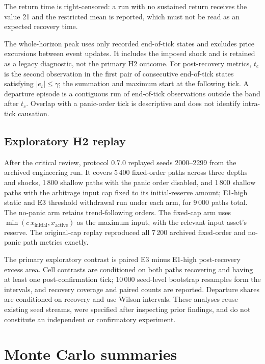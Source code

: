 The return time is right-censored: a run with no sustained return receives the value 21 and the restricted mean is reported, which must not be read as an expected recovery time.

The whole-horizon peak uses only recorded end-of-tick states and excludes price excursions between event updates. It includes the imposed shock and is retained as a legacy diagnostic, not the primary H2 outcome. For post-recovery metrics, $t_c$ is the second observation in the first pair of consecutive end-of-tick states satisfying $|e_t|\le\gamma$; the summation and maximum start at the following tick. A departure episode is a contiguous run of end-of-tick observations outside the band after $t_c$. Overlap with a panic-order tick is descriptive and does not identify intra-tick causation.

\subsection{Exploratory H2 replay}
\label{sec:h2-replay-method}

After the critical review, protocol 0.7.0 replayed seeds 2000--2299 from the archived engineering run. It covers 5\,400 fixed-order paths across three depths and shocks, 1\,800 shallow paths with the panic order disabled, and 1\,800 shallow paths with the arbitrage input cap fixed to its initial-reserve amount; E1-high static and E3 threshold withdrawal run under each arm, for 9\,000 paths total. The no-panic arm retains trend-following orders. The fixed-cap arm uses $\min(c\,x_{\mathrm{initial}},x_{\mathrm{active}})$ as the maximum input, with the relevant input asset's reserve. The original-cap replay reproduced all 7\,200 archived fixed-order and no-panic path metrics exactly.

The primary exploratory contrast is paired E3 minus E1-high post-recovery excess area. Cell contrasts are conditioned on both paths recovering and having at least one post-confirmation tick; 10\,000 seed-level bootstrap resamples form the intervals, and recovery coverage and paired counts are reported. Departure shares are conditioned on recovery and use Wilson intervals. These analyses reuse existing seed streams, were specified after inspecting prior findings, and do not constitute an independent or confirmatory experiment.

\section{Monte Carlo summaries}
\label{sec:analisis-estadistico}

